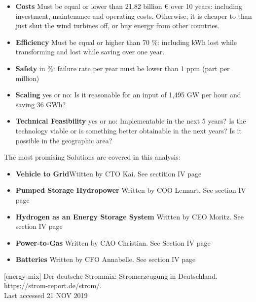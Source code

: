 \begin{parcolumns}[colwidths={1=2.5 cm, 2=10 cm, 3=2.5cm}]{3}
{\begin{itemize}
\item \textbf{Costs} Must be equal or lower than 21.82 billion \euro{ } over 10 years: including investment, maintenance and operating costs. Otherwise, it is cheaper to than just shut the wind turbines off, or buy energy from other countries.
\item \textbf{Efficiency} Must be equal or higher than 70 $\%$: including kWh lost while transforming and lost while saving over one year.
\item \textbf{Safety} in $\%$: failure rate per year must be lower than 1 ppm (part per million)
\item \textbf{Scaling} yes or no: Is it reasonable for an input of 1,495 GW per hour and saving 36 GWh? 
\item \textbf{Technical Feasibility} yes or no: Implementable in the next 5 years? Is the technology viable or is something better obtainable in the next years? Is it possible in the geographic area?  
\\
\end{itemize}
The most promising Solutions are covered in this analysis:
\begin{itemize}
\item \textbf{Vehicle to Grid}\newline Wtitten by CTO Kai. See sectition IV page \pageref{V2G_Kai}
\item \textbf{Pumped Storage Hydropower} \newline Written by COO Lennart. See section IV page \pageref{PumpedStorageHydropower_Lennart}
\item \textbf{Hydrogen as an Energy Storage System} \newline Written by CEO Moritz. See section IV page \pageref{H2_Moritz}
\item \textbf{Power-to-Gas} \newline Written by CAO Christian. See Section IV page \pageref{PowertoGas_Christian}
\item \textbf{Batteries} \newline Written by CFO Annabelle. See section IV page \pageref{Batteries}
\\
\end{itemize}
[energy-mix]  Der deutsche Strommix: Stromerzeugung in Deutschland. \\https://strom-report.de/strom/.\\Last accessed 21 NOV 2019


}


\end{parcolumns}